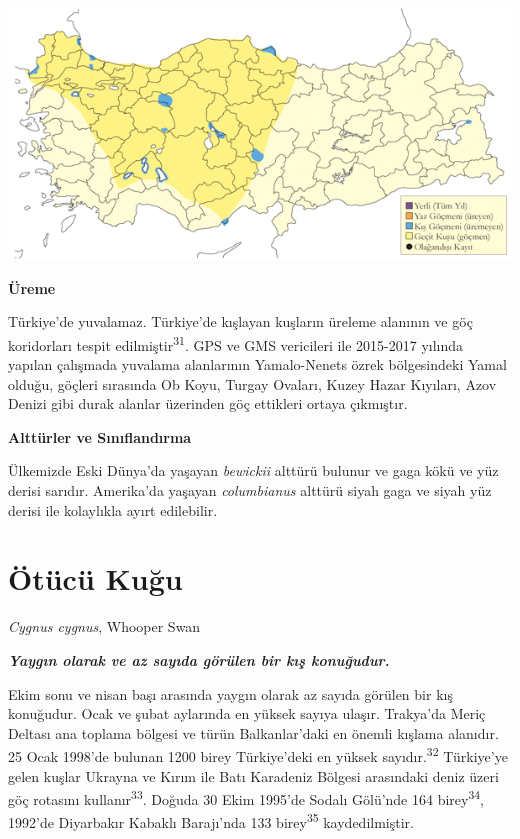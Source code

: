 \documentclass[
  letterpaper,
  DIV=11,
  numbers=noendperiod]{scrreprt}
\begin{document}
\includegraphics{images/harita_Page_009.png}

\textbf{Üreme}

Türkiye'de yuvalamaz. Türkiye'de kışlayan kuşların üreleme alanının ve
göç koridorları tespit edilmiştir\textsuperscript{31}. GPS ve GMS
vericileri ile 2015-2017 yılında yapılan çalışmada yuvalama alanlarının
Yamalo-Nenets özrek bölgesindeki Yamal olduğu, göçleri sırasında Ob
Koyu, Turgay Ovaları, Kuzey Hazar Kıyıları, Azov Denizi gibi durak
alanlar üzerinden göç ettikleri ortaya çıkmıştır.

\textbf{Alttürler ve Sınıflandırma}

Ülkemizde Eski Dünya'da yaşayan \emph{bewickii} alttürü bulunur ve gaga
kökü ve yüz derisi sarıdır. Amerika'da yaşayan \emph{columbianus}
alttürü siyah gaga ve siyah yüz derisi ile kolaylıkla ayırt edilebilir.

\section{Ötücü Kuğu}\label{uxf6tuxfccuxfc-kuux11fu}

\emph{Cygnus cygnus}, Whooper Swan

\textbf{\emph{Yaygın olarak ve az sayıda görülen bir kış konuğudur.}}

Ekim sonu ve nisan başı arasında yaygın olarak az sayıda görülen bir kış
konuğudur. Ocak ve şubat aylarında en yüksek sayıya ulaşır. Trakya'da
Meriç Deltası ana toplama bölgesi ve türün Balkanlar'daki en önemli
kışlama alanıdır. 25 Ocak 1998'de bulunan 1200 birey Türkiye'deki en
yüksek sayıdır.\textsuperscript{32} Türkiye'ye gelen kuşlar Ukrayna ve
Kırım ile Batı Karadeniz Bölgesi arasındaki deniz üzeri göç rotasını
kullanır\textsuperscript{33}. Doğuda 30 Ekim 1995'de Sodalı Gölü'nde 164
birey\textsuperscript{34}, 1992'de Diyarbakır Kabaklı Barajı'nda 133
birey\textsuperscript{35} kaydedilmiştir.
\end{document}
